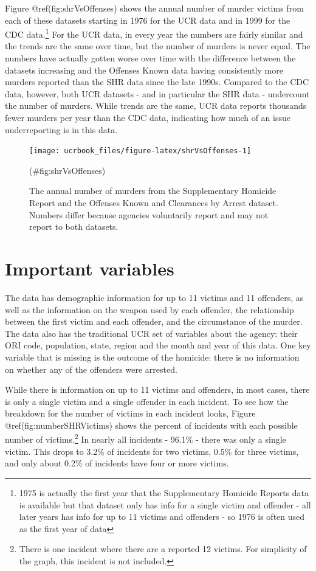 \documentclass[
  12pt,
  openany]{book}
\begin{document}
Figure @ref(fig:shrVsOffenses) shows the annual number of murder victims from each of these datasets starting in 1976 for the UCR data and in 1999 for the CDC data.\footnote{1975 is actually the first year that the Supplementary Homicide Reports data is available but that dataset only has info for a single victim and offender - all later years has info for up to 11 victims and offenders - so 1976 is often used as the first year of data} For the UCR data, in every year the numbers are fairly similar and the trends are the same over time, but the number of murders is never equal. The numbers have actually gotten worse over time with the difference between the datasets increasing and the Offenses Known data having consistently more murders reported than the SHR data since the late 1990s. Compared to the CDC data, however, both UCR datasets - and in particular the SHR data - undercount the number of murders. While trends are the same, UCR data reports thousands fewer murders per year than the CDC data, indicating how much of an issue underreporting is in this data.

\begin{figure}

{\centering \texttt{[image: ucrbook\_files/figure-latex/shrVsOffenses-1]} 

}

\caption{The annual number of murders from the Supplementary Homicide Report and the Offenses Known and Clearances by Arrest dataset. Numbers differ because agencies voluntarily report and may not report to both datasets.}(\#fig:shrVsOffenses)
\end{figure}

\hypertarget{important-variables-3}{%
\section{Important variables}\label{important-variables-3}}

The data has demographic information for up to 11 victims and 11 offenders, as well as the information on the weapon used by each offender, the relationship between the first victim and each offender, and the circumstance of the murder. The data also has the traditional UCR set of variables about the agency: their ORI code, population, state, region and the month and year of this data. One key variable that is missing is the outcome of the homicide: there is no information on whether any of the offenders were arrested.

While there is information on up to 11 victims and offenders, in most cases, there is only a single victim and a single offender in each incident. To see how the breakdown for the number of victims in each incident looks, Figure @ref(fig:numberSHRVictims) shows the percent of incidents with each possible number of victims.\footnote{There is one incident where there are a reported 12 victims. For simplicity of the graph, this incident is not included.} In nearly all incidents - 96.1\% - there was only a single victim. This drops to 3.2\% of incidents for two victims, 0.5\% for three victims, and only about 0.2\% of incidents have four or more victims.
\end{document}
